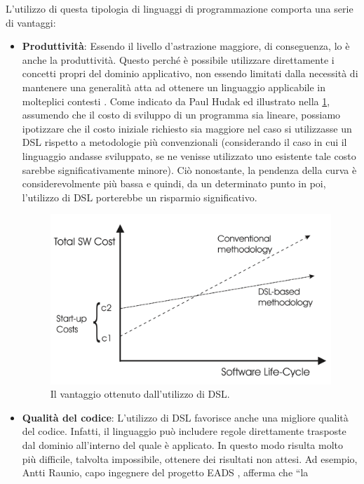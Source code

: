 \documentclass[12pt,a4paper,openright,twoside]{book}
\begin{document}
L’utilizzo di questa tipologia di linguaggi di programmazione comporta una serie di vantaggi:
\begin{itemize}
    \item \textbf{Produttività}: Essendo il livello d’astrazione maggiore, di conseguenza, lo è anche la produttività. Questo perché è 
    possibile utilizzare direttamente i concetti propri del dominio applicativo, non essendo limitati dalla necessità di mantenere una 
    generalità atta ad ottenere un linguaggio applicabile in molteplici contesti  \cite{Kelly2008}. Come indicato da Paul Hudak 
    \cite{Hudak1997} ed illustrato nella \cref{fig:sw-dev-cost}, assumendo che il costo di sviluppo di un programma sia lineare, possiamo 
    ipotizzare che il costo iniziale richiesto sia maggiore nel caso si utilizzasse un \ac{DSL} rispetto a metodologie più convenzionali 
    (considerando il caso in cui il linguaggio andasse sviluppato, se ne venisse utilizzato uno esistente tale costo sarebbe significativamente 
    minore). Ciò nonostante, la pendenza della curva è considerevolmente più bassa e quindi, da un determinato punto in poi, l’utilizzo di 
    \ac{DSL} porterebbe un risparmio significativo.
    \begin{figure}[H]
        \centering
        \includegraphics[width=.8\linewidth]{figures/sw-dev-cost.pdf}
        \caption{Il vantaggio ottenuto dall'utilizzo di DSL.}
        \label{fig:sw-dev-cost}
    \end{figure}
    \item \textbf{Qualità del codice}: L'utilizzo di \ac{DSL} favorisce anche una migliore qualità del codice. Infatti, il linguaggio può 
    includere regole direttamente trasposte dal dominio all'interno del quale è applicato. In questo modo risulta molto più difficile, talvolta 
    impossibile, ottenere dei risultati non attesi. Ad esempio, Antti Raunio, capo ingegnere del progetto EADS \cite{EADS}, afferma che ``la 

\end{itemize}
\end{document}
